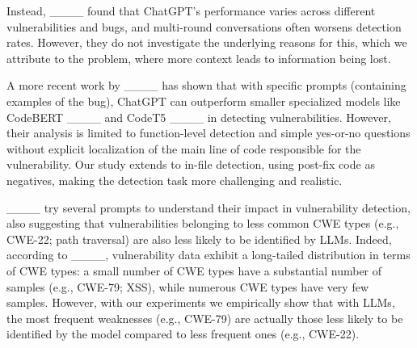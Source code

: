 	Instead, ____ found that ChatGPT's performance varies across different vulnerabilities and bugs, and multi-round conversations often worsens detection rates. However, they do not investigate the underlying reasons for this, which we attribute to the  problem, where more context leads to information being lost.
	
	
	A more recent work by ____ has shown that with specific prompts (containing examples of the bug), ChatGPT can outperform smaller specialized models like CodeBERT ____ and CodeT5 ____ in detecting vulnerabilities. However, their analysis is limited to function-level detection and simple yes-or-no questions without explicit localization of the main line of code responsible for the vulnerability. Our study extends to in-file detection, using post-fix code as negatives, making the detection task more challenging and realistic.
	
	
	____ try several prompts to understand their impact in vulnerability detection, also suggesting that vulnerabilities belonging to less common \ac{CWE} types (e.g., CWE-22; path traversal) are also less likely to be identified by \acp{LLM}.
	Indeed, according to ____, vulnerability data exhibit a long-tailed distribution in terms of \ac{CWE} types: a small number of \ac{CWE} types have a substantial number of samples (e.g., CWE-79; \ac{XSS}), while numerous \ac{CWE} types have very few samples. However, with our experiments we empirically show that with \acp{LLM}, the most frequent weaknesses (e.g., CWE-79) are actually those less likely to be identified by the model compared to less frequent ones (e.g., CWE-22).
	
